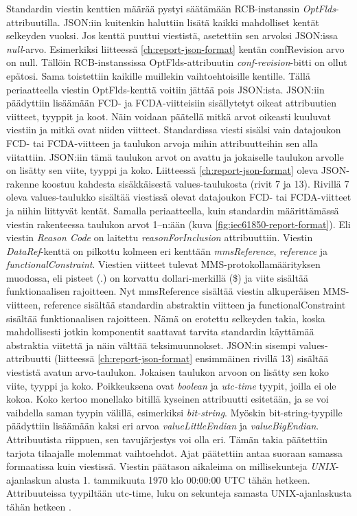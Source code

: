 Standardin viestin kenttien määrää pystyi säätämään RCB-instanssin \emph{OptFlds}-attribuutilla. JSON:iin kuitenkin haluttiin lisätä kaikki mahdolliset kentät selkeyden vuoksi. Jos kenttä puuttui viestistä, asetettiin sen arvoksi JSON:issa \emph{null}-arvo. Esimerkiksi liitteessä \ref{ch:report-json-format} kentän confRevision arvo on null. Tällöin RCB-instanssissa OptFlds-attribuutin \emph{conf-revision}-bitti on ollut epätosi. Sama toistettiin kaikille muillekin vaihtoehtoisille kentille. Tällä periaatteella viestin OptFlds-kenttä voitiin jättää pois JSON:ista. JSON:iin päädyttiin lisäämään FCD- ja FCDA-viitteisiin sisällytetyt oikeat attribuutien viitteet, tyyppit ja koot. Näin voidaan päätellä mitkä arvot oikeasti kuuluvat viestiin ja mitkä ovat niiden viitteet. Standardissa viesti sisälsi vain datajoukon FCD- tai FCDA-viitteen ja taulukon arvoja mihin attribuutteihin sen alla viitattiin. JSON:iin tämä taulukon arvot on avattu ja jokaiselle taulukon arvolle on lisätty sen viite, tyyppi ja koko. Liitteessä \ref{ch:report-json-format} oleva JSON-rakenne koostuu kahdesta sisäkkäisestä values-taulukosta (rivit 7 ja 13). Rivillä 7 oleva values-taulukko sisältää viestissä olevat datajoukon FCD- tai FCDA-viitteet ja niihin liittyvät kentät. Samalla periaatteella, kuin standardin määrittämässä viestin rakenteessa taulukon arvot 1--n:ään (kuva \ref{fig:iec61850-report-format}). Eli viestin \emph{Reason Code} on laitettu \emph{reasonForInclusion} attribuuttiin. Viestin \emph{DataRef}-kenttä on pilkottu kolmeen eri kenttään \emph{mmsReference}, \emph{reference} ja \emph{functionalConstraint}. Viestien viitteet tulevat MMS-protokollamäärityksen muodossa, eli pisteet (.) on korvattu dollari-merkillä (\$) ja viite sisältää funktionaalisen rajoitteen. Nyt mmsReference sisältää viestin alkuperäisen MMS-viitteen, reference sisältää standardin abstraktin viitteen ja functionalConstraint sisältää funktionaalisen rajoitteen. Nämä on erotettu selkeyden takia, koska mahdollisesti jotkin komponentit saattavat tarvita standardin käyttämää abstraktia viitettä ja näin välttää teksimuunnokset. JSON:in sisempi values-attribuutti (liitteessä \ref{ch:report-json-format} ensimmäinen rivillä 13) sisältää viestistä avatun arvo-taulukon. Jokaisen taulukon arvoon on lisätty sen koko viite, tyyppi ja koko. Poikkeuksena ovat \emph{boolean} ja \emph{utc-time} tyypit, joilla ei ole kokoa. Koko kertoo monellako bitillä kyseinen attribuutti esitetään, ja se voi vaihdella saman tyypin välillä, esimerkiksi \emph{bit-string}. Myöskin bit-string-tyypille päädyttiin lisäämään kaksi eri arvoa \emph{valueLittleEndian} ja \emph{valueBigEndian}. Attribuutista riippuen, sen tavujärjestys voi olla eri. Tämän takia päätettiin tarjota tilaajalle molemmat vaihtoehdot. Ajat päätettiin antaa suoraan samassa formaatissa kuin viestissä. Viestin päätason aikaleima on millisekunteja \emph{UNIX}-ajanlaskun alusta 1. tammikuuta 1970 klo 00:00:00 UTC tähän hetkeen. Attribuuteissa tyypiltään utc-time, luku on sekunteja samasta UNIX-ajanlaskusta tähän hetkeen \mbox{\cite[s.~26--27]{IEC61850-7-2}}.


